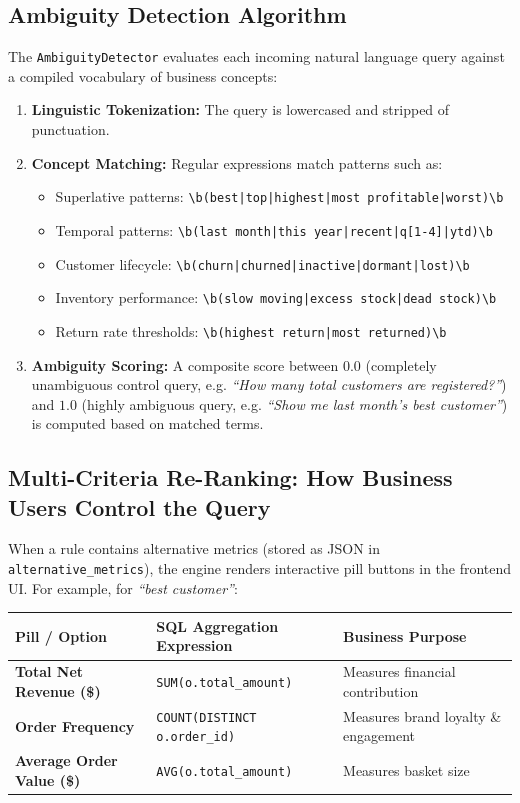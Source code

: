 \documentclass[10pt,a4paper]{article}
\begin{document}
\subsection{Ambiguity Detection Algorithm}
The \texttt{AmbiguityDetector} evaluates each incoming natural language query against a compiled vocabulary of business concepts:
\begin{enumerate}
    \item \textbf{Linguistic Tokenization:} The query is lowercased and stripped of punctuation.
    \item \textbf{Concept Matching:} Regular expressions match patterns such as:
    \begin{itemize}
        \item Superlative patterns: \texttt{\textbackslash b(best|top|highest|most profitable|worst)\textbackslash b}
        \item Temporal patterns: \texttt{\textbackslash b(last month|this year|recent|q[1-4]|ytd)\textbackslash b}
        \item Customer lifecycle: \texttt{\textbackslash b(churn|churned|inactive|dormant|lost)\textbackslash b}
        \item Inventory performance: \texttt{\textbackslash b(slow moving|excess stock|dead stock)\textbackslash b}
        \item Return rate thresholds: \texttt{\textbackslash b(highest return|most returned)\textbackslash b}
    \end{itemize}
    \item \textbf{Ambiguity Scoring:} A composite score between $0.0$ (completely unambiguous control query, e.g. \textit{``How many total customers are registered?''}) and $1.0$ (highly ambiguous query, e.g. \textit{``Show me last month's best customer''}) is computed based on matched terms.
\end{enumerate}

\subsection{Multi-Criteria Re-Ranking: How Business Users Control the Query}
When a rule contains alternative metrics (stored as JSON in \texttt{alternative\_metrics}), the engine renders interactive pill buttons in the frontend UI. For example, for \textit{``best customer''}:

\begin{center}
\begin{tabularx}{0.95\textwidth}{l l X}
\toprule
\textbf{Pill / Option} & \textbf{SQL Aggregation Expression} & \textbf{Business Purpose} \\
\midrule
\textbf{Total Net Revenue (\$)} & \texttt{SUM(o.total\_amount)} & Measures financial contribution \\
\textbf{Order Frequency} & \texttt{COUNT(DISTINCT o.order\_id)} & Measures brand loyalty \& engagement \\
\textbf{Average Order Value (\$)} & \texttt{AVG(o.total\_amount)} & Measures basket size \\
\bottomrule
\end{tabularx}
\end{center}
\end{document}
